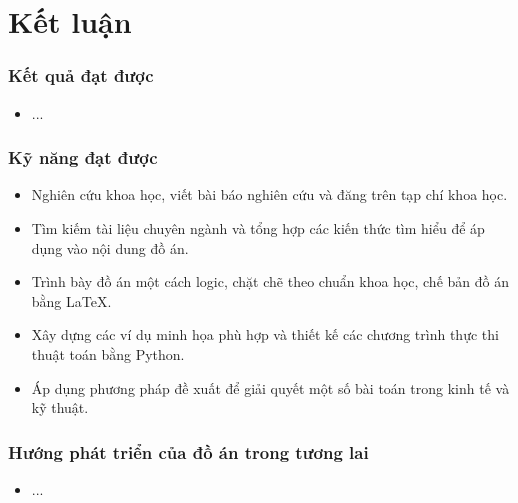\chapter*{Kết luận}                         %
\setcounter{section}{0}
\renewcommand*{\thesection}{\the\value{section}}


\subsection*{Kết quả đạt được} 

\begin{itemize}
    \item ...
\end{itemize}

\vspace{5mm}
\subsection*{Kỹ năng đạt được}
\begin{itemize}
    \item Nghiên cứu khoa học, viết bài báo nghiên cứu và đăng trên tạp chí khoa học.
    \item Tìm kiếm tài liệu chuyên ngành và tổng hợp các kiến thức tìm hiểu để áp dụng vào nội dung đồ án.
    \item Trình bày đồ án một cách logic, chặt chẽ theo chuẩn khoa học, chế bản đồ án bằng \LaTeX.
    \item Xây dựng các ví dụ minh họa phù hợp và thiết kế các chương trình thực thi thuật toán bằng Python. 
    \item Áp dụng phương pháp đề xuất để giải quyết một số bài toán trong kinh tế và kỹ thuật.
\end{itemize}


\subsection*{Hướng phát triển của đồ án trong tương lai}

\begin{itemize}
    \item ...
\end{itemize}
